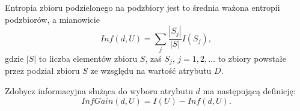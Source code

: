 Entropia zbioru podzielonego na podzbiory jest to średnia ważona entropii podzbiorów, a mianowicie
$$ Inf(d,U) = \sum_j \frac{|S_j|}{|S|}I(S_j),$$
gdzie $|S|$ to liczba elementów  zbioru $S$, zaś $S_j$, $j=1,2,\dots$ to zbiory
powstałe przez podział zbioru $S$ ze wzsględu na wartość atrybutu $D$.

Zdobycz informacyjna służąca do wyboru atrybutu $d$ ma następującą definicję:
$$ InfGain(d,U) = I(U) - Inf(d,U).$$
